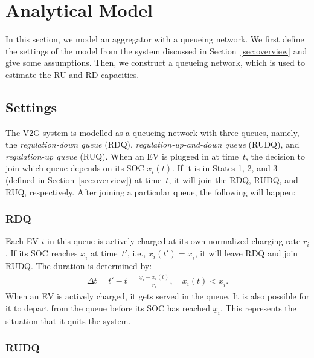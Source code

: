 \documentclass[journal]{IEEEtran}
\begin{document}
\section{Analytical Model} \label{sec:model}

In this section, we model an aggregator with a queueing network.  We first
define the settings of the model from the system discussed in
Section~\ref{sec:overview} and give some assumptions.  Then, we construct a
queueing network, which is used to estimate the RU and RD capacities.

\subsection{Settings}

The V2G system is modelled as a queueing network with three queues, namely, the \textit{regulation-down queue} (RDQ), \textit{regulation-up-and-down queue}
(RUDQ), and \textit{regulation-up queue} (RUQ).  When an EV is plugged in at
time~$t$, the decision to join which queue depends on its SOC $x_i(t)$.  If it
is in States 1, 2, and 3 (defined in Section~\ref{sec:overview}) at time~$t$,
it will join the RDQ, RUDQ, and RUQ, respectively.  After joining a particular
queue, the following will happen:

\subsubsection{RDQ}

Each EV $i$ in this queue is actively charged at its own normalized charging
rate $r_i$.  If its SOC reaches $\underline{x}_i$ at time~$t'$, i.e.,
$x_i(t') = \underline{x}_i$, it will leave RDQ and join RUDQ.  The duration is
determined by:
\begin{align}
\Delta t = t' - t
	 = \frac{\underline{x}_i - x_i(t)}{r_i}, \quad x_i(t) < \underline{x}_i.
\label{q1time}
\end{align}
When an EV is actively charged, it gets served in the queue.  It is also
possible for it to depart from the queue before its SOC has reached
$\underline{x}_i$.  This represents the situation that it quits the system. 

\subsubsection{RUDQ}
\end{document}
